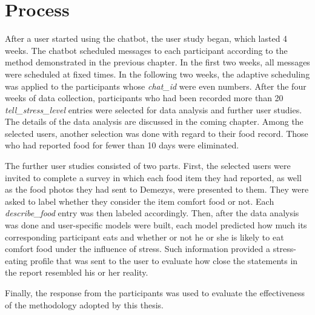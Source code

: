 \section{Process}
After a user started using the chatbot, the user study began, which lasted 4 weeks. The chatbot scheduled messages to each participant according to the method demonstrated in the previous chapter. In the first two weeks, all messages were scheduled at fixed times. In the following two weeks, the adaptive scheduling was applied to the participants whose \emph{chat\_id} were even numbers. After the four weeks of data collection, participants who had been recorded more than 20 \emph{tell\_stress\_level} entries were selected for data analysis and further user studies. The details of the data analysis are discussed in the coming chapter. Among the selected users, another selection was done with regard to their food record. Those who had reported food for fewer than 10 days were eliminated.

The further user studies consisted of two parts. First, the selected users were invited to complete a survey in which each food item they had reported, as well as the food photos they had sent to Demezys, were presented to them. They were asked to label whether they consider the item comfort food or not. Each \emph{describe\_food} entry was then labeled accordingly. Then, after the data analysis was done and user-specific models were built, each model predicted how much its corresponding participant eats and whether or not he or she is likely to eat comfort food under the influence of stress. Such information provided a stress-eating profile that was sent to the user to evaluate how close the statements in the report resembled his or her reality.

Finally, the response from the participants was used to evaluate the effectiveness of the methodology adopted by this thesis.

